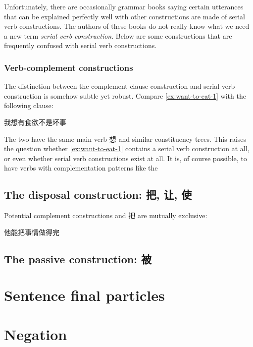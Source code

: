 \documentclass[UTF8, a4paper, oneside, scheme=plain]{ctexart}
\newcommand*{\term}[1]{\emph{#1}}
\begin{document}
Unfortunately, there are occasionally grammar books 
saying certain utterances that can be explained perfectly well 
with other constructions
are made of serial verb constructions.
The authors of these books do not really know 
what we need a new term \term{serial verb construction}.
Below are some constructions that are frequently confused with serial verb constructions.

\subsubsection{Verb-complement constructions}



The distinction between the complement clause construction %
and serial verb construction is somehow subtle yet robust.
Compare \eqref{ex:want-to-eat-1} with the following clause:
\begin{exe}
    \ex\label{ex:want-to-eat-2} 我想有食欲不是坏事
\end{exe}
The two have the same main verb 想 and similar constituency trees.
This raises the question whether \eqref{ex:want-to-eat-1} contains a serial verb construction at all,
or even whether serial verb constructions exist at all.
It is, of course possible, to have verbs with complementation patterns like the

\subsection{The disposal construction: 把, 让, 使}\label{sec:disposal}

Potential complement constructions and 把 are mutually exclusive:
\begin{exe}
    \ex *他能把事情做得完
\end{exe}

\subsection{The passive construction: 被}

\section{Sentence final particles}

\section{Negation}
\end{document}
